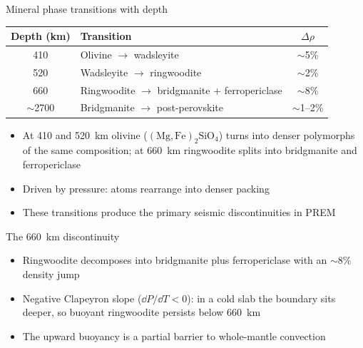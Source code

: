 \documentclass[aspectratio=169, 11pt]{beamer}
\begin{document}
\begin{frame}{Mineral phase transitions with depth}
  \centering
  \small
  \begin{tabular}{c l c}
    \toprule
    \textbf{Depth (km)} & \textbf{Transition} & \textbf{$\Delta\rho$} \\
    \midrule
    410  & Olivine $\rightarrow$ wadsleyite & $\sim$5\% \\
    520  & Wadsleyite $\rightarrow$ ringwoodite & $\sim$2\% \\
    660  & Ringwoodite $\rightarrow$ bridgmanite + ferropericlase & $\sim$8\% \\
    $\sim$2700 & Bridgmanite $\rightarrow$ post-perovskite & $\sim$1--2\% \\
    \bottomrule
  \end{tabular}
  \vskip10pt
  \raggedright
  \begin{itemize}\setlength\itemsep{3pt}
    \item At 410 and 520~km olivine ($\mathrm{(Mg,Fe)_2SiO_4}$) turns into denser polymorphs of the same composition; at 660~km ringwoodite splits into bridgmanite and ferropericlase
    \item Driven by pressure: atoms rearrange into denser packing
    \item These transitions produce the primary seismic discontinuities in PREM
  \end{itemize}
\end{frame}

\begin{frame}
\end{frame}

\begin{frame}{The 660~km discontinuity}
  \begin{itemize}\setlength\itemsep{4pt}
    \item Ringwoodite decomposes into bridgmanite plus ferropericlase with an $\sim$8\% density jump
    \item Negative Clapeyron slope ($\dd P/\dd T < 0$): in a cold slab the boundary sits deeper, so buoyant ringwoodite persists below 660~km
    \item The upward buoyancy is a partial barrier to whole-mantle convection
  \end{itemize}
  \vskip8pt
\end{frame}
\end{document}
